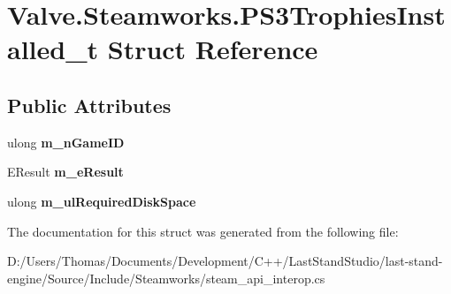 \hypertarget{structValve_1_1Steamworks_1_1PS3TrophiesInstalled__t}{}\section{Valve.\+Steamworks.\+P\+S3\+Trophies\+Installed\+\_\+t Struct Reference}
\label{structValve_1_1Steamworks_1_1PS3TrophiesInstalled__t}
\subsection*{Public Attributes}
\begin{DoxyCompactItemize}
\item 
\hypertarget{structValve_1_1Steamworks_1_1PS3TrophiesInstalled__t_aa06308b72a656a34d849789c11044d89}{}ulong {\bfseries m\+\_\+n\+Game\+I\+D}\label{structValve_1_1Steamworks_1_1PS3TrophiesInstalled__t_aa06308b72a656a34d849789c11044d89}

\item 
\hypertarget{structValve_1_1Steamworks_1_1PS3TrophiesInstalled__t_a274b1d4d12a26388b05f4f50e3191910}{}E\+Result {\bfseries m\+\_\+e\+Result}\label{structValve_1_1Steamworks_1_1PS3TrophiesInstalled__t_a274b1d4d12a26388b05f4f50e3191910}

\item 
\hypertarget{structValve_1_1Steamworks_1_1PS3TrophiesInstalled__t_a9806f476e62cef1f71c55cd0f230084a}{}ulong {\bfseries m\+\_\+ul\+Required\+Disk\+Space}\label{structValve_1_1Steamworks_1_1PS3TrophiesInstalled__t_a9806f476e62cef1f71c55cd0f230084a}

\end{DoxyCompactItemize}


The documentation for this struct was generated from the following file\+:\begin{DoxyCompactItemize}
\item 
D\+:/\+Users/\+Thomas/\+Documents/\+Development/\+C++/\+Last\+Stand\+Studio/last-\/stand-\/engine/\+Source/\+Include/\+Steamworks/steam\+\_\+api\+\_\+interop.\+cs\end{DoxyCompactItemize}
